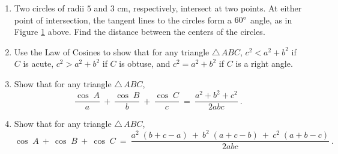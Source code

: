 {\begin{enumerate}[\bfseries 1.]
\begin{figure}[h]
\begin{minipage}[t]{7.5cm}
\begin{center}
 \end{center}
 \caption[]{\quad Exercise \ref{exer:quad}}
 \label{fig:exerquad}
\end{minipage}
\begin{minipage}[t]{7.5cm}
 \begin{center}
  \vspace{-5mm}
 \end{center}
 \caption[]{\quad Exercise \ref{exer:tancircs}}
 \label{fig:exertancircs}
\end{minipage}
\end{figure}\vspace{-2mm}
 \item\label{exer:tancircs} Two circles of radii $5$ and $3$ cm, respectively, intersect at two
 points. At either point of intersection, the tangent lines to the circles form a $60^\circ$
 angle, as in Figure \ref{fig:exertancircs} above. Find the distance between the centers of the
 circles.
 \item Use the Law of Cosines to show that for any triangle $\triangle\,ABC$,
  $c^2 < a^2 + b^2$ if $C$ is acute, $c^2 > a^2 + b^2$ if $C$ is obtuse, and $c^2 = a^2 + b^2$
 if $C$ is a right angle.
 \item Show that for any triangle $\triangle\,ABC$,
 \begin{displaymath}
  \frac{\cos\;A}{a} ~+~ \frac{\cos\;B}{b} ~+~ \frac{\cos\;C}{c} ~=~ \frac{a^2 + b^2 + c^2}{2abc}~.
 \end{displaymath}
 \item Show that for any triangle $\triangle\,ABC$,
 \begin{displaymath}
  \cos\;A ~+~ \cos\;B ~+~ \cos\;C ~=~ \frac{a^2 \;(b+c-a)~+~ b^2 \;(a+c-b)~+~ c^2 \;(a+b-c)}{2abc}~.

\end{displaymath}
\end{enumerate}}
